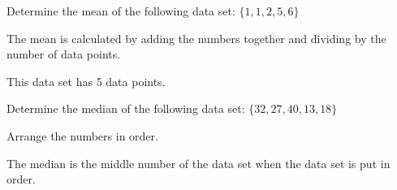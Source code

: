 \documentclass{ximera}
\begin{document}
\begin{question}
Determine the mean of the following data set: $\{1, 1, 2, 5, 6\}$

    \begin{hint}
      The mean is calculated by adding the numbers together and dividing by the number of data points.
    \end{hint}
    \begin{hint}
      This data set has 5 data points.
    \end{hint}
    \begin{multipleChoice}
    \end{multipleChoice}

\end{question}

\begin{question}
Determine the median of the following data set: $\{32, 27, 40, 13, 18\}$

    \begin{hint}
      Arrange the numbers in order.
    \end{hint}
    \begin{hint}
      The median is the middle number of the data set when the data set is put in order.
    \end{hint}
    \begin{multipleChoice}
    \end{multipleChoice}

\end{question}
\end{document}
